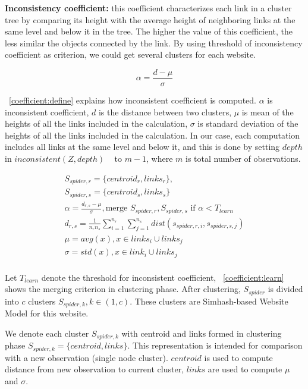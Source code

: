 {\bf Inconsistency coefficient:} this coefficient characterizes each link in a cluster tree by
comparing its height with the average height of neighboring links at the same
level and below it in the tree. The higher the value of this
coefficient, the less similar the
objects connected by the link. By using threshold of inconsistency
coefficient as criterion, we could get several clusters for each website.

\begin{equation}
  \label{coefficient:define}
  \alpha  = \frac{d - \mu}{\sigma}
\end{equation}

~\autoref{coefficient:define} explains how inconsistent coefficient is computed.
$\alpha$ is inconsistent coefficient, $d$ is the distance between two
clusters, $\mu$ is mean of the heights of all the links included in the
calculation, $\sigma$ is standard deviation of the heights of all the links
included in the calculation. In our case, each computation includes all links at
the same level and below it, and this is done by setting $depth$ in
$inconsistent(Z, depth)$ ~\cite{icintro} to $m-1$, where $m$ is total number of observations.

\begin{equation}
  \label{coefficient:learn}
  \begin{gathered}
    S_{spider, r} = \{centroid_r, links_r\}, \\
    S_{spider, s} = \{centroid_s, links_s\} \\
    \alpha = \frac{d_{r,s} - \mu}{\sigma}, \text{merge } S_{spider, r},
    S_{spider, s} \text{ if } \alpha < T_{learn} \\
    d_{r, s} = \frac{1}{n_rn_s}\sum_{i=1}^{n_r}\sum_{j=1}^{n_s} dist(s_{spider,
    r, i}, s_{spider, s, j}) \\ 
  \mu = avg(x), x \in  links_i \cup links_j \\
  \sigma = std(x), x \in link_i \cup links_j \\
\end{gathered}
\end{equation}

Let $T_{learn}$ denote the threshold for inconsistent coefficient, 
~\autoref{coefficient:learn} shows the merging criterion in clustering phase.
After clustering, $S_{spider}$ is divided into $c$ clusters $S_{spider, k}, k \in (1, c)$.
These clusters are Simhash-based Website Model for this website.

We denote each cluster $S_{spider, k}$ with centroid and links formed in
clustering phase $S_{spider, k} = \{centroid, links\}$. This representation is
intended for comparison with a new observation (single node cluster). $centroid$ is used to
compute distance from new observation to current cluster, $links$ are used
to compute $\mu$ and $\sigma$.

